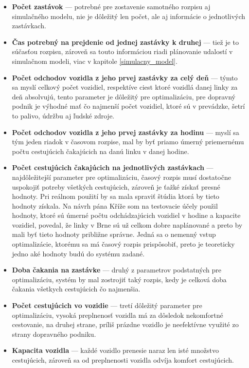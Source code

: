 \begin{itemize}
  \item \textbf{Počet zastávok} --- potrebné pre zostavenie samotného rozpisu aj simulačného modelu, nie je dôležitý len počet, ale aj informácie o jednotlivých zastávkach.
  \item \textbf{Čas potrebný na prejdenie od jednej zastávky k druhej} --- tiež je to súčasťou rozpisu, zároveň sa touto informáciou riadi plánovanie udalostí v simulačnom modeli, viac v kapitole \ref{simulacny_model}.
  \item \textbf{Počet odchodov vozidla z jeho prvej zastávky za celý deň} --- týmto sa myslí celkový počet vozidiel, respektíve ciest ktoré vozidlá danej linky za deň absolvujú, tento parameter je dôležitý pre optimalizáciu, pre dopravný podnik je výhodné mať čo najmenší počet vozidiel, ktoré sú v prevádzke, šetrí to palivo, údržbu aj ľudské zdroje.
  \item \textbf{Počet odchodov vozidla z jeho prvej zastávky za hodinu} --- myslí sa tým jeden riadok v časovom rozpise, mal by byť priamo úmerný priemernému počtu cestujúcich čakajúcich na danú linku v danej hodine.
  \item \textbf{Počet cestujúcich čakajúcich na jednotlivých zastávkach} --- najdôležitejší parameter pre optimalizáciu, časový rozpis musí dostatočne uspokojiť potreby všetkých cestujúcich, zároveň je ťažké získať presné hodnoty. Pri reálnom použití by sa mala spraviť štúdia ktorá by tieto hodnoty získala. Na návrh pána Kříže som na testovacie účely použil hodnoty, ktoré sú úmerné počtu odchádzajúcich vozidiel v hodine a kapacite vozidiel, povedal, že linky v Brne sú už celkom dobre naplánované a preto by mali byť tieto hodnoty približne správne. Jedná sa o nemenný vstup optimalizácie, ktorému sa má časový rozpis prispôsobiť, preto je teoreticky jedno aké hodnoty budú do systému zadané.
  \item \textbf{Doba čakania na zastávke} --- druhý z parametrov podstatných pre optimalizáciu, systém by mal zostrojiť taký rozpis, kedy je celková doba čakania všetkych cestujúcich čo najmenšia.
  \item \textbf{Počet cestujúcich vo vozidie} --- tretí dôležitý parameter pre optimalizáciu, vysoká preplnenosť vozidla má za dôsledok nekomfortné cestovanie, na druhej strane, príliš prázdne vozidlo je neefektívne využité zo strany dopravného podniku.
  \item \textbf{Kapacita vozidla} --- každé vozidlo prenesie naraz len isté množstvo cestujúcich, zároveň sa od preplnenosti vozidla odvíja komfort cestujúcich.

\end{itemize}
